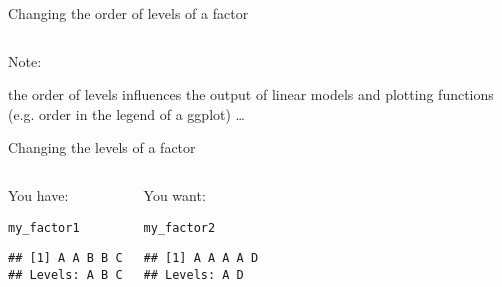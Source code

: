 \documentclass[xcolor=dvipsnames, aspectratio=1610, 9pt]{beamer}\usepackage[]{graphicx}\usepackage[]{color}
\makeatletter
\newcommand{\hlstd}[1]{\textcolor[rgb]{0.345,0.345,0.345}{#1}}%
\newenvironment{kframe}{%
 \def\at@end@of@kframe{}%
 \ifinner\ifhmode%
  \def\at@end@of@kframe{\end{minipage}}%
  \begin{minipage}{\columnwidth}%
 \fi\fi%
 \def\FrameCommand##1{\hskip\@totalleftmargin \hskip-\fboxsep
 \colorbox{shadecolor}{##1}\hskip-\fboxsep
     \hskip-\linewidth \hskip-\@totalleftmargin \hskip\columnwidth}%
 \MakeFramed {\advance\hsize-\width
   \@totalleftmargin\z@ \linewidth\hsize
   \@setminipage}}%
 {\par\unskip\endMakeFramed%
 \at@end@of@kframe}
\newenvironment{knitrout}{}{} %
\makeatother
\begin{document}
\begin{frame}[containsverbatim]{Changing the order of levels of a factor}
\begin{columns}
\begin{center}
\end{center}
\end{columns}
\vfill

Note:

the order of levels influences the output of linear models and plotting functions (e.g. order in the legend of a ggplot) \dots
\end{frame}

\begin{frame}[containsverbatim]{Changing the levels of a factor}


\begin{columns}
\begin{center}
You have:
\begin{knitrout}\scriptsize
{}\color{fgcolor}\begin{kframe}
\begin{alltt}
\hlstd{my_factor1}
\end{alltt}
\begin{verbatim}
## [1] A A B B C
## Levels: A B C
\end{verbatim}
\end{kframe}
\end{knitrout}
\end{center}

\begin{center}
You want:
\begin{knitrout}\scriptsize
{}\color{fgcolor}\begin{kframe}
\begin{alltt}
\hlstd{my_factor2}
\end{alltt}
\begin{verbatim}
## [1] A A A A D
## Levels: A D
\end{verbatim}
\end{kframe}
\end{knitrout}
\end{center}
\end{columns}

\begin{columns}


\end{columns}
\end{frame}
\end{document}
